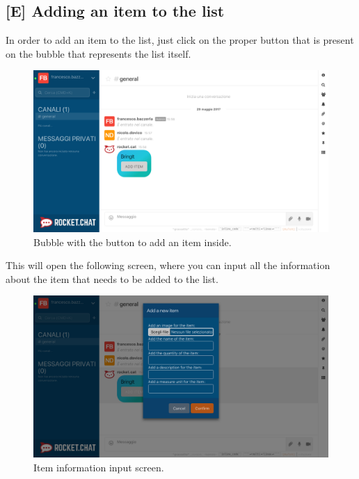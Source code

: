 \newpage
\subsection{[E] Adding an item to the list}
In order to add an item to the list, just click on the proper button that is present on the bubble that represents the list itself.

\begin{figure}[H]
  \centering 
  \includegraphics[width=\textwidth]{Sections/3-HowToUse/Images/bubble_empty.png}
  \caption{Bubble with the button to add an item inside.}
\end{figure}

This will open the following screen, where you can input all the information about the item that needs to be added to the list. \\

\begin{figure}[H]
  \centering 
  \includegraphics[width=\textwidth]{Sections/3-HowToUse/Images/item_add.png}
  \caption{Item information input screen.}
\end{figure}

